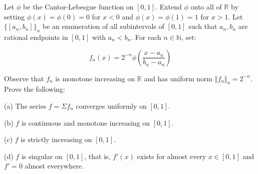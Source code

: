 \documentclass[10pt]{article}
\newenvironment{problem}[2][Problem]{\begin{trivlist}
\item[\hskip \labelsep {\bfseries #1}\hskip \labelsep {\bfseries #2.}]}{\end{trivlist}}
\begin{document}
\begin{problem}{5.4.8}

Let $\phi$ be the Cantor-Lebesgue function on $[0,1]$. Extend $\phi$ onto all of $\mathbb{R}$ by setting $\phi(x) = \phi(0) = 0$ for $x < 0$ and $\phi(x) = \phi(1) = 1$ for $x > 1$. Let $\{ [a_n,b_n] \}_n$ be an enumeration of all subintervals of $[0,1]$ such that $a_n,b_n$ are rational endpoints in $[0,1]$ with $a_n < b_n$. For each $n \in \mathbb{N}$, set:

$$ f_n(x) = 2^{-n} \phi\left( \frac{x - a_n}{b_n - a_n} \right)$$

Observe that $f_n$ is monotone increasing on $\mathbb{R}$ and has uniform norm $\Vert f_n \Vert_u = 2^{-n}$. Prove the following:

(a) The series $f = \Sigma f_n$ converges uniformly on $[0,1]$.

(b) $f$ is continuous and monotone increasing on $[0,1]$.

(c) $f$ is strictly increasing on $[0,1]$.

(d) $f$ is singular on $[0,1]$, that is, $f'(x)$ exists for almost every $x \in [0,1]$ and $f' = 0$ almost everywhere.

\end{problem}
\end{document}
